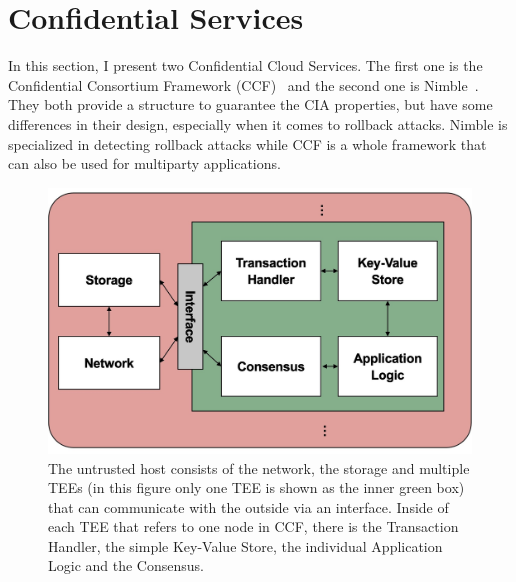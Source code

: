 \section{Confidential Services}
In this section, I present two Confidential Cloud Services. The first one is the Confidential Consortium Framework (CCF)~\cite{Howard} and the second one is Nimble~\cite{Nimble}. They both provide a structure to guarantee the CIA properties, but have some differences in their design, especially when it comes to rollback attacks. Nimble is specialized in detecting rollback attacks while CCF is a whole framework that can also be used for multiparty applications.

 \begin{figure}[t]
	\includegraphics[scale=0.14]{pictures/ccf}
	\caption{The untrusted host consists of the network,  the storage and multiple TEEs (in this figure only one TEE is shown as the inner green box) that can communicate with the outside via an interface. Inside of each TEE that refers to one node in CCF, there is the Transaction Handler, the simple Key-Value Store, the individual Application Logic and the Consensus.}
	\label{ccf}
\end{figure}

